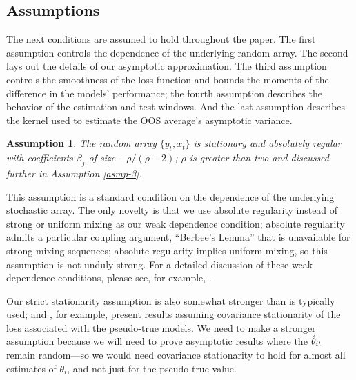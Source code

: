 \documentclass[11pt]{article}
\newtheorem{asmp}{Assumption}
\begin{document}
\subsection{Assumptions}

The next conditions are assumed to hold throughout the paper.  The first
assumption controls the dependence of the underlying random array.
The second lays out the details of our asymptotic approximation.
The third assumption controls the
smoothness of the loss function and bounds the moments of the
difference in the models' performance; the fourth assumption describes
the behavior of the estimation and test windows.  And the last
assumption describes the kernel used to estimate the OOS average's
asymptotic variance.

\begin{asmp}\label{asmp-1}
  The random array $\{y_t,x_t\}$ is stationary and absolutely regular
  with coefficients $\beta_j$ of size $-\rho/(\rho-2)$; $\rho$ is
  greater than two and discussed further in Assumption \ref{asmp-3}.
\end{asmp}

This assumption is a standard condition on the dependence of the
underlying stochastic array. The only novelty is that we use
absolute regularity instead of strong or uniform mixing as our
weak dependence condition; absolute regularity admits a particular
coupling argument, ``Berbee's Lemma'' \citep[reproduced in this
paper as Lemma A.1 for reference]{Ber:79} that is
unavailable for strong mixing sequences; absolute regularity
implies uniform mixing, so this assumption is not unduly strong.
For a detailed discussion of these weak dependence conditions,
please see, for example, \citet{Dav:94}.

Our strict stationarity assumption is also somewhat stronger than is
typically used; \citet{Wes:96} and \citet{Mcc:07}, for example,
present results assuming covariance stationarity of the loss
associated with the pseudo-true models. We need to make a stronger
assumption because we will need to prove asymptotic results where the
$\hat\theta_{it}$ remain random---so we would need covariance stationarity to
hold for almost all estimates of $\theta_i$, and not just for the
pseudo-true value.
\end{document}
